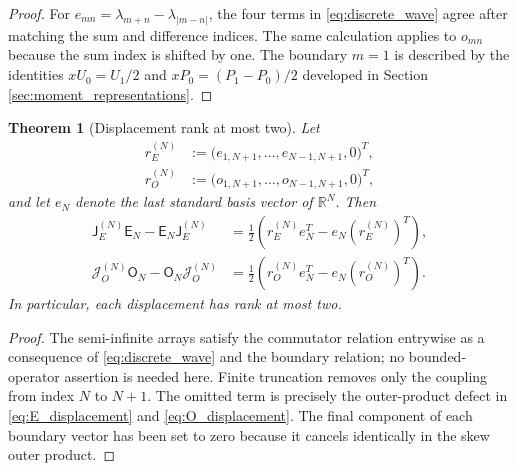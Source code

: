 \documentclass[11pt]{amsart}
\numberwithin{equation}{section}
\theoremstyle{plain}
\newtheorem{theorem}{Theorem}[section]
\theoremstyle{definition}
\theoremstyle{remark}
\newcommand{\E}{\mathsf E}
\newcommand{\Omat}{\mathsf O}
\newcommand{\J}{\mathsf J}
\begin{document}
\begin{proof}
For $e_{mn}=\lambda_{m+n}-\lambda_{|m-n|}$, the four terms in \eqref{eq:discrete_wave} agree after matching the sum and difference indices. The same calculation applies to $o_{mn}$ because the sum index is shifted by one. The boundary $m=1$ is described by the identities $xU_0=U_1/2$ and $xP_0=(P_1-P_0)/2$ developed in Section \ref{sec:moment_representations}.
\end{proof}

\begin{theorem}[Displacement rank at most two]
\label{thm:rank_two_displacement}
Let
\begin{align}
r_E^{(N)}&:=\bigl(e_{1,N+1},\dots,e_{N-1,N+1},0\bigr)^T,
\label{eq:rE_definition}\\
r_O^{(N)}&:=\bigl(o_{1,N+1},\dots,o_{N-1,N+1},0\bigr)^T,
\label{eq:rO_definition}
\end{align}
and let $e_N$ denote the last standard basis vector of $\mathbb R^N$. Then
\begin{align}
\J_E^{(N)}\E_N-\E_N\J_E^{(N)}
&=\frac12\left(r_E^{(N)}e_N^T-e_N(r_E^{(N)})^T\right),
\label{eq:E_displacement}\\
\mathcal J_O^{(N)}\Omat_N-\Omat_N\mathcal J_O^{(N)}
&=\frac12\left(r_O^{(N)}e_N^T-e_N(r_O^{(N)})^T\right).
\label{eq:O_displacement}
\end{align}
In particular, each displacement has rank at most two.
\end{theorem}

\begin{proof}
The semi-infinite arrays satisfy the commutator relation entrywise as a consequence of \eqref{eq:discrete_wave} and the boundary relation; no bounded-operator assertion is needed here. Finite truncation removes only the coupling from index $N$ to $N+1$. The omitted term is precisely the outer-product defect in \eqref{eq:E_displacement} and \eqref{eq:O_displacement}. The final component of each boundary vector has been set to zero because it cancels identically in the skew outer product.
\end{proof}
\end{document}
